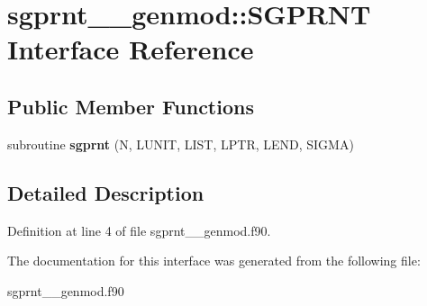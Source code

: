 \hypertarget{interfacesgprnt____genmod_1_1_s_g_p_r_n_t}{\section{sgprnt\+\_\+\+\_\+genmod\+:\+:S\+G\+P\+R\+N\+T Interface Reference}
\label{interfacesgprnt____genmod_1_1_s_g_p_r_n_t}
}
\subsection*{Public Member Functions}
\begin{DoxyCompactItemize}
\item 
\hypertarget{interfacesgprnt____genmod_1_1_s_g_p_r_n_t_a714c3e8ecb7d4a97a742199e3c34fdc6}{subroutine {\bfseries sgprnt} (N, L\+U\+N\+I\+T, L\+I\+S\+T, L\+P\+T\+R, L\+E\+N\+D, S\+I\+G\+M\+A)}\label{interfacesgprnt____genmod_1_1_s_g_p_r_n_t_a714c3e8ecb7d4a97a742199e3c34fdc6}

\end{DoxyCompactItemize}


\subsection{Detailed Description}


Definition at line 4 of file sgprnt\+\_\+\+\_\+genmod.\+f90.



The documentation for this interface was generated from the following file\+:\begin{DoxyCompactItemize}
\item 
sgprnt\+\_\+\+\_\+genmod.\+f90\end{DoxyCompactItemize}
